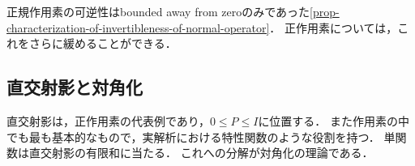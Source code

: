 \documentclass[uplatex,dvipdfmx]{jsreport}
\begin{document}
\begin{remarks}
    正規作用素の可逆性はbounded away from zeroのみであった\ref{prop-characterization-of-invertibleness-of-normal-operator}．
    正作用素については，これをさらに緩めることができる．
\end{remarks}

\subsection{直交射影と対角化}

\begin{tcolorbox}[colframe=ForestGreen, colback=ForestGreen!10!white,breakable,colbacktitle=ForestGreen!40!white,coltitle=black,fonttitle=\bfseries\sffamily,
title=対角化とは，直交射影への標準分解をいう．]
    直交射影は，正作用素の代表例であり，$0\le P\le I$に位置する．
    また作用素の中でも最も基本的なもので，実解析における特性関数のような役割を持つ．
    単関数は直交射影の有限和に当たる．
    これへの分解が対角化の理論である．
\end{tcolorbox}
\end{document}
